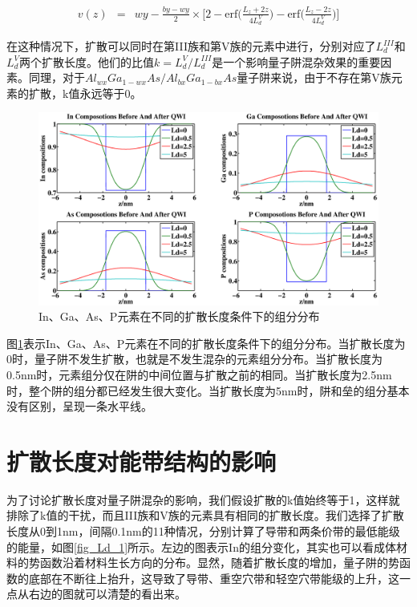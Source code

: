 \documentclass{ZJUthesis}
\begin{document}
\begin{eqnarray}
    v(z)&=&wy-\frac{by-wy}{2} \times \biggr[2-\textrm{erf}\biggr(\frac{L_z+2z}{4L_d^{V}}\biggr) -\textrm{erf}\biggr(\frac{L_z-2z}{4L_d^{V}}\biggr)\biggr]
\end{eqnarray}

在这种情况下，扩散可以同时在第III族和第V族的元素中进行，分别对应了$L_d^{III}$和$L_d^V$两个扩散长度。他们的比值$k=L_d^V/L_d^{III}$是一个影响量子阱混杂效果的重要因素。同理，对于$Al_{wx}Ga_{1-wx}As/Al_{bx}Ga_{1-bx}As$量子阱来说，由于不存在第V族元素的扩散，k值永远等于0。

\begin{figure}[!t]
    \centering
    \includegraphics[width=1.0\textwidth]{./Pictures/composition.eps}
    \caption{In、Ga、As、P元素在不同的扩散长度条件下的组分分布}
    \label{fig_composition}
\end{figure}

图\ref{fig_composition}表示In、Ga、As、P元素在不同的扩散长度条件下的组分分布。当扩散长度为0时，量子阱不发生扩散，也就是不发生混杂的元素组分分布。当扩散长度为0.5nm时，元素组分仅在阱的中间位置与扩散之前的相同。当扩散长度为2.5nm时，整个阱的组分都已经发生很大变化。当扩散长度为5nm时，阱和垒的组分基本没有区别，呈现一条水平线。

\section{扩散长度对能带结构的影响}

为了讨论扩散长度对量子阱混杂的影响，我们假设扩散的k值始终等于1，这样就排除了k值的干扰，而且III族和V族的元素具有相同的扩散长度。我们选择了扩散长度从0到1nm，间隔0.1nm的11种情况，分别计算了导带和两条价带的最低能级的能量，如图\ref{fig_Ld_1}所示。左边的图表示In的组分变化，其实也可以看成体材料的势函数沿着材料生长方向的分布。显然，随着扩散长度的增加，量子阱的势函数的底部在不断往上抬升，这导致了导带、重空穴带和轻空穴带能级的上升，这一点从右边的图就可以清楚的看出来。
\end{document}
